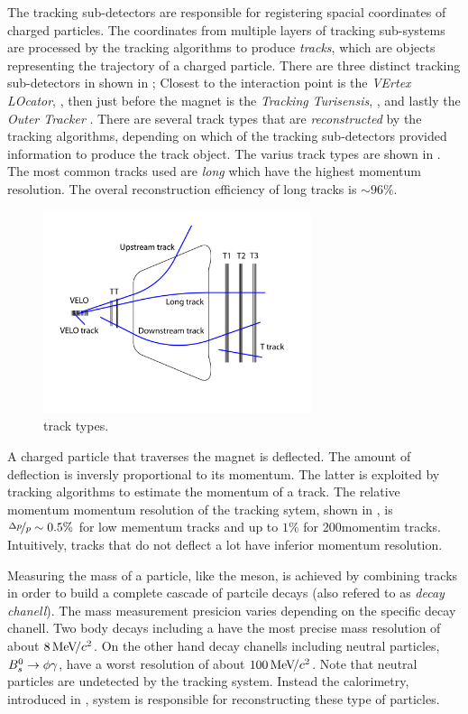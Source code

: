 The tracking sub-detectors are responsible for registering spacial coordinates of charged particles.
The coordinates from multiple layers of tracking sub-systems are processed by the tracking algorithms
to produce {\it tracks}, which are objects representing the trajectory of a charged particle. There are
three distinct tracking sub-detectors in \lhcb shown in ; Closest to the interaction point is
the {\it VErtex LOcator}, \velo, then just before the \lhcb magnet is the {\it Tracking Turisensis}, \ttracker,
and  lastly the {\it Outer Tracker} \ot. There are several track types that are {\it reconstructed} by
the tracking algorithms, depending on which of the tracking sub-detectors provided information to produce
the track object. The varius track types are shown in . The most common tracks used are {\it long}
which have the highest momentum resolution. The overal reconstruction efficiency of long tracks is $\sim 96\%$.

\begin{figure}[t]
  \centering
  \includegraphics[width=0.7\textwidth]{Figures/Chapter2/trackTypesRunIAndII}
  \caption{\lhcb track types.}
  \label{track_types}
\end{figure}

A charged particle that traverses the \lhcb magnet is deflected. The amount of deflection is inversly proportional
to its momentum. The latter is exploited by tracking algorithms to estimate the momentum of a track. The relative
momentum momentum resolution of the tracking sytem, shown in , is $\nicefrac{\Delta p}{p} \sim 0.5 \%$
for low mementum tracks and up to $1\%$ for 200\gevc momentim tracks. Intuitively, tracks that do not deflect a
lot have inferior momentum resolution.

Measuring the mass of a particle, like the \Bs meson, is achieved by combining tracks in order to build a complete
cascade of partcile decays (also refered to as {\it decay chanell}). The mass measurement presicion varies depending
on the specific decay chanell. Two body \B decays including a \jpsi have the most precise mass resolution of about
$8 {\mathrm{\,Me\kern -0.1em V\!/}c^2}$. On the other hand decay chanells including neutral particles, \ie $B^0_s\rightarrow\phi\gamma$, have a worst resolution of
about $100 {\mathrm{\,Me\kern -0.1em V\!/}c^2}$. Note that neutral particles are undetected by the tracking system. Instead the calorimetry,
introduced in , system is responsible for reconstructing these type of particles.

